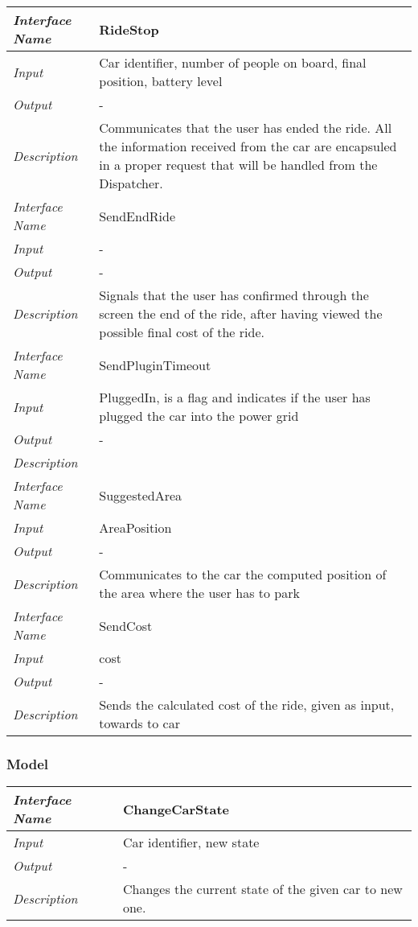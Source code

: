 \documentclass[11pt,a4paper]{report}
\begin{document}
\begin{tabularx}{\textwidth}{|>{\em}l|X|}
	\hline
	\hline
	Interface Name& RideStop\\
	\hline
	Input & Car identifier, number of people on board, final position, battery level\\
	\hline
	Output & -\\
	\hline
	Description &Communicates that the user has ended the ride. All the information received from the car are encapsuled in a proper request that will be handled from the Dispatcher.\\
	\hline
	\hline
	Interface Name& SendEndRide\\
	\hline
	Input & -\\
	\hline
	Output & -\\
	\hline
	Description &Signals that the user has confirmed through the screen the end of the ride, after having viewed the possible final cost of the ride.\\
	\hline
	\hline
	Interface Name& SendPluginTimeout\\
	\hline
	Input & PluggedIn, is a flag and indicates if the user has plugged the car into the power grid\\
	\hline
	Output & -\\
	\hline
	Description & \\
	\hline
	\hline
	Interface Name& SuggestedArea\\
	\hline
	Input &AreaPosition\\
	\hline
	Output & -\\
	\hline
	Description &Communicates to the car the computed position of the area where the user has to park\\
	\hline
	\hline
	Interface Name& SendCost\\
	\hline
	Input &cost\\
	\hline
	Output & -\\
	\hline
	Description &Sends the calculated cost of the ride, given as input, towards to car\\
	\hline
\end{tabularx}
\subsubsection{Model}
\begin{tabularx}{\textwidth}{|>{\em}l|X|}
	\hline
	Interface Name& ChangeCarState\\
	\hline
	Input & Car identifier, new state\\
	\hline
	Output & -\\
	\hline
	Description &Changes the current state of the given car to new one.\\
	\hline
\end{tabularx}
\end{document}
